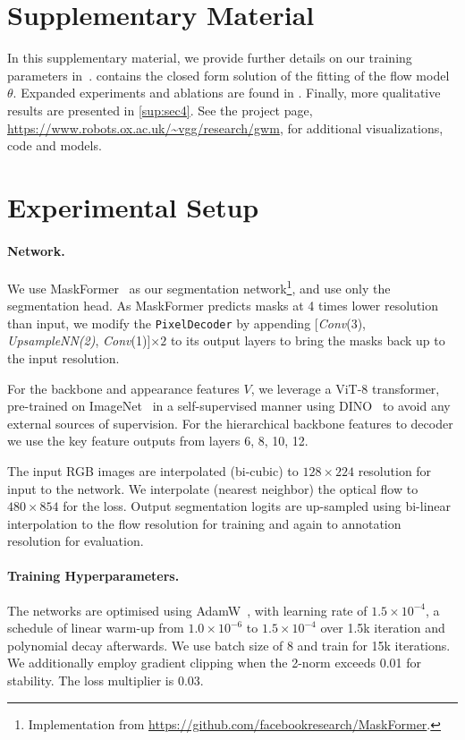 \noindent
\section*{Supplementary Material}
In this supplementary material, we provide further details on our training parameters in~.  contains the closed form solution of the fitting of the flow model $\theta$. Expanded experiments and ablations are found in . Finally, more qualitative results are presented in \cref{sup:sec4}. See the project page, \url{https://www.robots.ox.ac.uk/~vgg/research/gwm}, for additional visualizations, code and models.



\section{Experimental Setup}\label{sup:sec1}
\paragraph{Network.} We use MaskFormer~\cite{cheng2021maskformer} as our segmentation network\footnote{Implementation from  \url{https://github.com/facebookresearch/MaskFormer}.}, and use only the segmentation head. As MaskFormer predicts masks at 4 times lower resolution than input, we modify the \texttt{PixelDecoder} by appending [\textit{Conv}(3), \textit{UpsampleNN(2)}, \textit{Conv}(1)]$\times 2$ to its output layers to bring the masks back up to the input resolution.

For the backbone and appearance features $V$, we leverage a ViT-8 transformer, 
pre-trained on ImageNet~\cite{russakovsky2015imagenet} in a self-supervised manner using DINO~\cite{Caron_2021_ICCV}
to avoid any external sources of supervision. For the hierarchical backbone features to decoder we use the key feature outputs from layers 6, 8, 10, 12.

The input RGB images are interpolated (bi-cubic) to $128\times224$ resolution for input to the network. We interpolate (nearest neighbor) the optical flow to $480\times854$ for the loss.
Output segmentation logits are up-sampled using bi-linear interpolation to the flow resolution for training and again to annotation resolution for evaluation.


\paragraph{Training Hyperparameters.}\label{sup:hparam}
The networks are optimised using AdamW~\cite{loshchilov2018decoupled}, 
with learning rate of $1.5\times10^{-4}$, a schedule of linear warm-up from $1.0\times10^{-6}$ to $1.5\times10^{-4}$ over 1.5k iteration and polynomial decay afterwards. We use batch size of 8 and train for 15k iterations. We additionally employ gradient clipping when the 2-norm exceeds 0.01 for stability. The loss multiplier is $0.03$. 

